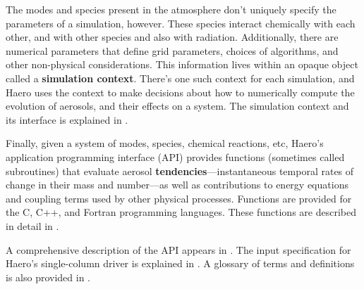 The modes and species present in the atmosphere don't uniquely specify the
parameters of a simulation, however. These species interact chemically with each
other, and with other species and also with radiation.  Additionally, there are
numerical parameters that define grid parameters, choices of algorithms, and
other non-physical considerations. This information lives within an opaque
object called a {\bf simulation context}. There's one such context for each
simulation, and Haero uses the context to make decisions about how to numerically
compute the evolution of aerosols, and their effects on a system. The simulation
context and its interface is explained in .

Finally, given a system of modes, species, chemical reactions, etc, Haero's
application programming interface (API) provides functions (sometimes called
subroutines) that evaluate aerosol {\bf tendencies}---instantaneous temporal
rates of change in their mass and number---as well as contributions to energy
equations and coupling terms used by other physical processes. Functions are
provided for the C, C++, and Fortran programming languages. These functions are
described in detail in .

A comprehensive description of the API appears in . The input
specification for Haero's single-column driver is explained in
. A glossary of terms and definitions is also provided in
.


